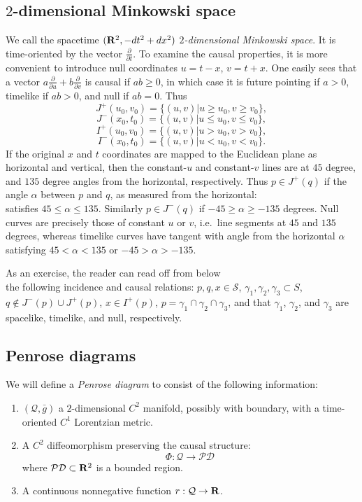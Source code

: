 \documentclass{article}
\begin{document}
\subsection{$2$-dimensional Minkowski space}
\label{2mink}
We call the spacetime $({\bf R}^2,-dt^2+dx^2)$ \emph{$2$-dimensional Minkowski
space}. It is time-oriented by the vector $\frac\partial{\partial t}$.
To examine the causal properties, it is more convenient to
introduce null coordinates $u=t-x$, $v=t+x$. 
One easily sees that a vector $a\frac\partial{\partial u}+
b\frac\partial{\partial v}$ is causal if $ab\ge0$, in which
case it is future pointing if $a>0$, timelike if $ab>0$,
and null if $ab=0$. Thus
\[
J^+(u_0,v_0)=\{(u,v)|u\ge u_0, v\ge v_0\},
\]
\[
J^-(x_0,t_0)=\{(u,v)|u\le u_0, v\le v_0\},
\]
\[
I^+(u_0,v_0)=\{(u,v)|u> u_0, v> v_0\},
\]
\[
I^-(x_0,t_0)=\{(u,v)|u< u_0, v< v_0\}.
\]
If the original $x$ and $t$ coordinates are
mapped to the Euclidean plane as horizontal and vertical, then the constant-$u$ 
and constant-$v$ lines are at $45$ degree, and $135$ degree angles from
the horizontal, respectively. Thus $p\in J^+(q)$ if the angle $\alpha$ between 
$p$ and $q$, as measured from the horizontal:
\[

\]
satisfies $45\le\alpha\le135$.
Similarly $p\in J^-(q)$ if $-45\ge\alpha\ge -135$ degrees.
Null curves are precisely those of constant $u$ or $v$,
i.e.~line segments at $45$ and $135$ degrees, whereas
timelike curves have tangent with angle from the horizontal $\alpha$
satisfying $45<\alpha<135$ or $-45>\alpha>-135$.

As an exercise, the reader can read off from below
\[

\]
the following incidence and causal relations:
$p,q,x\in \mathcal{S}$, $\gamma_1,\gamma_2, \gamma_3\subset S$, 
$q\not\in J^-(p)\cup J^+(p)$, $x\in I^+(p)$,
$p=\gamma_1\cap\gamma_2\cap\gamma_3$, and that $\gamma_1$,
$\gamma_2$, and $\gamma_3$ are spacelike, timelike, and null, respectively.

\subsection{Penrose diagrams}
\label{pdiag}

We will define a \emph{Penrose diagram} to consist of the following information:
\begin{enumerate}
\label{prw}
\item $(\mathcal{Q},\bar{g})$ a $2$-dimensional $C^2$ manifold, possibly with
boundary, with a time-oriented $C^1$ Lorentzian metric.
\item A $C^2$ diffeomorphism preserving the causal structure:
\[
\Phi:\mathcal{Q}\to \mathcal{PD}
\]
where $\mathcal{PD}\subset {\bf R}^2$ is a bounded region.
\item
\label{tele}
A continuous nonnegative function $r:\mathcal{Q}\to{\bf R}$.
\end{enumerate}
\end{document}
